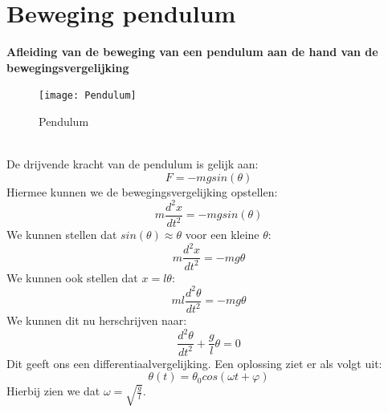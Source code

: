 \documentclass[a4paper,kul]{kulakarticle} %
\begin{document}
\section{Beweging pendulum}
\textbf{Afleiding van de beweging van een pendulum aan de hand van de bewegingsvergelijking}
\begin{figure}[htbp]
	\centering
	\texttt{[image: Pendulum]}
	\caption[Pendulum]{Pendulum}
	\label{fig:pendulum}
\end{figure} \\
De drijvende kracht van de pendulum is gelijk aan:
\begin{equation*}
	F = -mg sin(\theta)
\end{equation*}
Hiermee kunnen we de bewegingsvergelijking opstellen:
\begin{equation*}
	m\frac{d^2x}{dt^2} = -mgsin(\theta)
\end{equation*}
We kunnen stellen dat $sin(\theta) \approx \theta$ voor een kleine $\theta$:
\begin{equation*}
	m\frac{d^2x}{dt^2} = -mg\theta
\end{equation*}
We kunnen ook stellen dat $x = l\theta$:
\begin{equation*}
	ml\frac{d^2\theta}{dt^2} = -mg\theta
\end{equation*}
We kunnen dit nu herschrijven naar:
\begin{equation*}
	\frac{d^2\theta}{dt^2} +\frac{g}{l}\theta = 0
\end{equation*}
Dit geeft ons een differentiaalvergelijking. Een oplossing ziet er als volgt uit:
\begin{equation*}
	\theta (t) = \theta_0 cos(\omega t +\varphi)
\end{equation*}
Hierbij zien we dat $\omega = \sqrt{\frac{g}{l}}$.
\newpage
\end{document}
